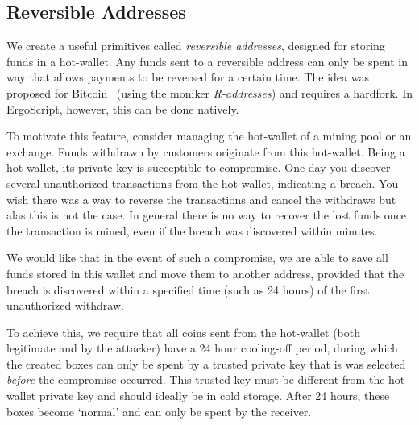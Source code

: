 \documentclass[11pt]{article}
\newcommand{\langname}{ErgoScript\xspace}
\begin{document}
\subsection{Reversible Addresses}

We create a useful primitives called {\em reversible addresses}, designed for storing funds in a hot-wallet. %
Any funds sent to a reversible address can only be spent in way that allows payments to be reversed for a certain time. The idea was proposed for Bitcoin~\cite{raddress} (using the moniker {\em R-addresses}) and requires a hardfork. In \langname, however, this can be done natively.

To motivate this feature, consider managing the hot-wallet of a mining pool or an exchange. Funds withdrawn by customers originate from this hot-wallet. Being a hot-wallet, its private key is succeptible to compromise. One day you discover several unauthorized transactions from the hot-wallet, indicating a breach. You wish there was a way to reverse the transactions and cancel the withdraws but alas this is not the case. In general there is no way to recover the lost funds once the transaction is mined, even if the breach was discovered within minutes. 

We would like that in the event of such a compromise, we are able to save all funds stored in this wallet and move them to another address, provided that the breach is discovered within a specified time (such as 24 hours) of the first unauthorized withdraw. 

To achieve this, we require that all coins sent from the hot-wallet (both legitimate and by the attacker)
have a 24 hour cooling-off period, during which the created boxes can only be spent by a trusted private key that is was selected {\em before} the compromise occurred. This trusted key must be different from the hot-wallet private key and should ideally be in cold storage. 
After 24 hours, these boxes become `normal' and can only be spent by the receiver.
\end{document}
